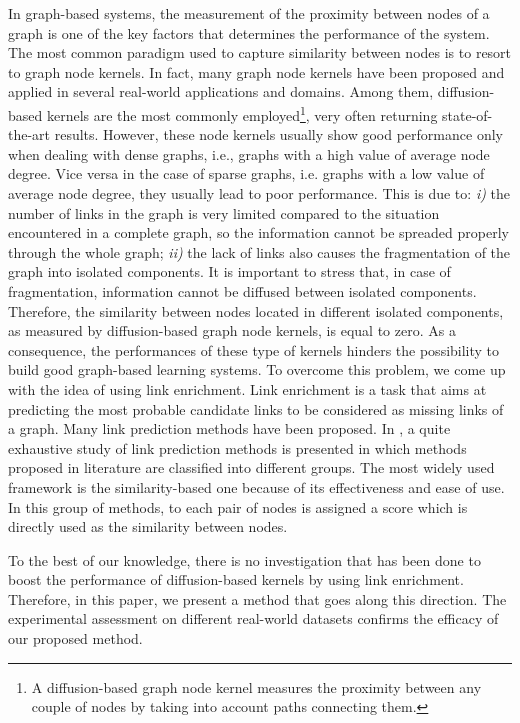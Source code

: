 In graph-based systems, the measurement of the proximity between nodes of a graph is one of the key factors that determines the performance of the system. The most common paradigm used to capture similarity between nodes is to resort to graph node kernels. In fact, many  graph node kernels have been proposed and applied in several real-world applications and domains. Among them, diffusion-based kernels \cite{proceeding2} are the most commonly employed\footnote{A diffusion-based graph node kernel measures the proximity between any couple of nodes by taking into account paths connecting them.}, very often returning state-of-the-art results. However, these node kernels usually show good performance only when dealing with dense graphs, i.e., graphs with a high value of average node degree. Vice versa in the case of sparse graphs, i.e. graphs with a low value of average node degree, they usually lead to poor performance. This is due to: {\it i)} the number of links in the graph is very limited compared to the situation encountered in a complete graph, so the information cannot be spreaded properly through the whole graph; {\it ii)} the lack of links also causes the fragmentation of the graph into isolated components. It is important to stress that, in case of fragmentation, information cannot be diffused between isolated components. Therefore, the similarity between nodes located in different isolated components, as measured by diffusion-based graph node kernels, is equal to zero. As a consequence, the performances of these type of kernels hinders the possibility to build good graph-based learning systems. To overcome this problem, we come up with the idea of using link enrichment. Link enrichment is a task that aims at predicting the most probable candidate links to be considered as missing links of a graph. Many link prediction methods have been proposed. In \cite{jour2}, a quite exhaustive study of link prediction methods is presented in which methods proposed in literature are classified into different groups. The most widely used framework is the similarity-based one because of its effectiveness and ease of use. In this group of methods, to each pair of nodes is assigned a score which is directly used as the similarity between nodes.

To the best of our knowledge, there is no investigation that has been done to boost the performance of diffusion-based kernels by using link enrichment. Therefore, in this paper, we present a method that goes along this direction.
The experimental assessment  on different real-world datasets confirms the efficacy of our proposed method.

